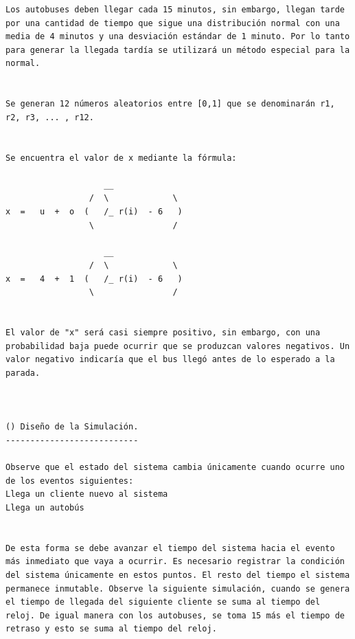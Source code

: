 \begin{verbatim}
Los autobuses deben llegar cada 15 minutos, sin embargo, llegan tarde por una cantidad de tiempo que sigue una distribución normal con una media de 4 minutos y una desviación estándar de 1 minuto. Por lo tanto para generar la llegada tardía se utilizará un método especial para la normal.


Se generan 12 números aleatorios entre [0,1] que se denominarán r1, r2, r3, ... , r12.


Se encuentra el valor de x mediante la fórmula:
                 
                    __          
                 /  \             \
x  =   u  +  o  (   /_ r(i)  - 6   )
                 \                /
 
                    __          
                 /  \             \
x  =   4  +  1  (   /_ r(i)  - 6   )
                 \                /


El valor de "x" será casi siempre positivo, sin embargo, con una probabilidad baja puede ocurrir que se produzcan valores negativos. Un valor negativo indicaría que el bus llegó antes de lo esperado a la parada.



() Diseño de la Simulación.
---------------------------

Observe que el estado del sistema cambia únicamente cuando ocurre uno de los eventos siguientes:
Llega un cliente nuevo al sistema
Llega un autobús


De esta forma se debe avanzar el tiempo del sistema hacia el evento más inmediato que vaya a ocurrir. Es necesario registrar la condición del sistema únicamente en estos puntos. El resto del tiempo el sistema permanece inmutable. Observe la siguiente simulación, cuando se genera el tiempo de llegada del siguiente cliente se suma al tiempo del reloj. De igual manera con los autobuses, se toma 15 más el tiempo de retraso y esto se suma al tiempo del reloj.




\end{verbatim}
